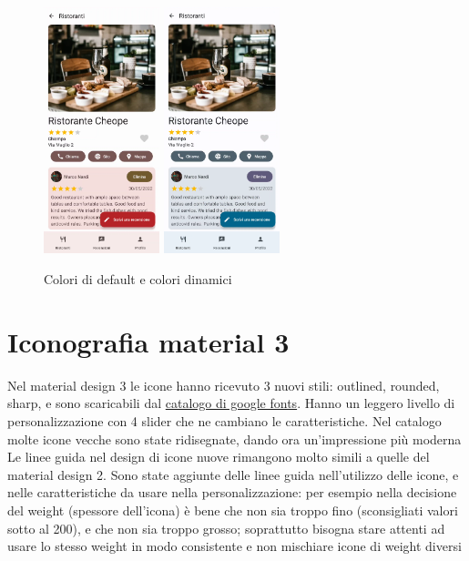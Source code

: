 \documentclass[12pt, a4paper]{report}
\begin{document}
		\begin{figure}[h]
   			\centering
   			\includegraphics[width=0.3\textwidth]{colori_default} %
   			\includegraphics[width=0.3\textwidth]{colori_dinamici} %
 			\caption{Colori di default e colori dinamici}
 			\label{gerarchia_colori}
		\end{figure}

	\section{Iconografia material 3}
		Nel material design 3 le icone hanno ricevuto 3 nuovi stili: outlined, rounded, sharp, e sono scaricabili dal \href{https://fonts.google.com/icons}{catalogo di google fonts}. Hanno un leggero livello di personalizzazione con 4 slider che ne cambiano le caratteristiche.
		Nel catalogo molte icone vecche sono state ridisegnate, dando ora un'impressione più moderna
		Le linee guida nel design di icone nuove rimangono molto simili a quelle del material design 2.
		Sono state aggiunte delle linee guida nell'utilizzo delle icone, e nelle caratteristiche da usare nella personalizzazione: per esempio nella decisione del weight (spessore dell'icona) è bene che non sia troppo fino (sconsigliati valori sotto al 200), e che non sia troppo grosso; soprattutto bisogna stare attenti ad usare lo stesso weight in modo consistente e non mischiare icone di weight diversi
\end{document}
